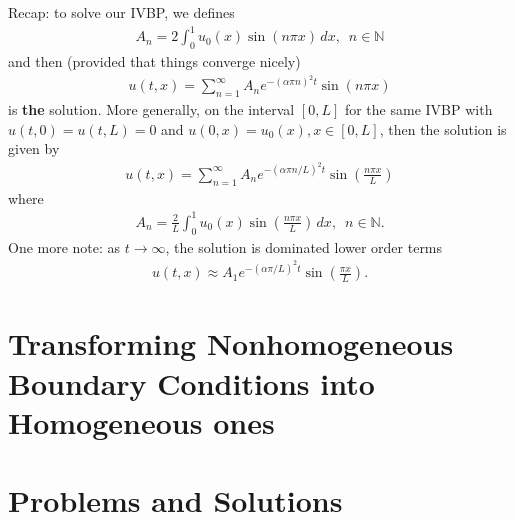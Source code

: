 \documentclass{article}
\theoremstyle{definition}
\begin{document}
Recap: to solve our IVBP, we defines 
\begin{align*}
A_n = 2\int_{0}^1 u_0(x)\sin(n\pi x)\,dx, \,\,\, n\in \mathbb{N}
\end{align*}
and then (provided that things converge nicely)
\begin{align*}
u(t,x) = \sum_{n=1}^\infty A_n e^{-(\alpha \pi n)^2 t}\sin(n\pi x)
\end{align*}
is \textbf{the} solution. More generally, on the interval $[0,L]$ for the same IVBP with $u(t,0) = u(t,L) = 0$ and $u(0,x) = u_0(x), x\in[0,L]$, then the solution is given by
\begin{align*}
u(t,x) = \sum_{n=1}^\infty A_n e^{-(\alpha \pi n/L)^2 t}\sin\left(\frac{n\pi x}{L}\right)
\end{align*}
where 
\begin{align*}
A_n = \frac{2}{L}\int_{0}^1 u_0(x)\sin\left(\frac{n\pi x}{L}\right)\,dx, \,\,\, n\in \mathbb{N}.
\end{align*}
One more note: as $t\to \infty$, the solution is dominated lower order terms
\begin{align*}
u(t,x)\approx A_1 e^{-(\alpha \pi/L)^2 t}\sin\left(\frac{\pi x}{L}\right).
\end{align*}





\newpage
\section{Transforming Nonhomogeneous Boundary Conditions into Homogeneous ones }




































\newpage

\section{Problems and Solutions}
\end{document}
